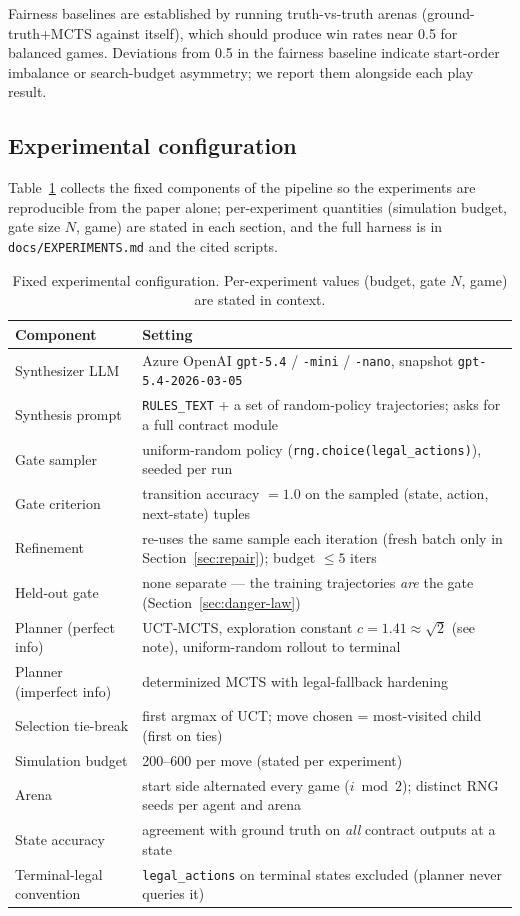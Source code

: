 \documentclass[11pt]{article}
\theoremstyle{remark}
\begin{document}
Fairness baselines are established by running truth-vs-truth arenas (ground-truth+MCTS against itself), which should produce win rates near 0.5 for balanced games. Deviations from 0.5 in the fairness baseline indicate start-order imbalance or search-budget asymmetry; we report them alongside each play result.

\subsection{Experimental configuration}
\label{sec:config}

Table~\ref{tab:config} collects the fixed components of the pipeline so the experiments are reproducible from the paper alone; per-experiment quantities (simulation budget, gate size $N$, game) are stated in each section, and the full harness is in \texttt{docs/EXPERIMENTS.md} and the cited scripts.

\begin{table}[ht]
\centering
\small
\begin{tabular}{@{}l p{}@{}}
\toprule
Component & Setting \\
\midrule
Synthesizer LLM & Azure OpenAI \texttt{gpt-5.4} / \texttt{-mini} / \texttt{-nano}, snapshot \texttt{gpt-5.4-2026-03-05} \\
Synthesis prompt & \texttt{RULES\_TEXT} + a set of random-policy trajectories; asks for a full contract module \\
Gate sampler & uniform-random policy (\texttt{rng.choice(legal\_actions)}), seeded per run \\
Gate criterion & transition accuracy $=1.0$ on the sampled (state, action, next-state) tuples \\
Refinement & re-uses the same sample each iteration (fresh batch only in Section~\ref{sec:repair}); budget $\leq 5$ iters \\
Held-out gate & none separate --- the training trajectories \emph{are} the gate (Section~\ref{sec:danger-law}) \\
Planner (perfect info) & UCT-MCTS, exploration constant $c = 1.41 \approx \sqrt{2}$ (see note), uniform-random rollout to terminal \\
Planner (imperfect info) & determinized MCTS \citep{cowling2012ismcts,long2010pimc} with legal-fallback hardening \\
Selection tie-break & first argmax of UCT; move chosen = most-visited child (first on ties) \\
Simulation budget & 200--600 per move (stated per experiment) \\
Arena & start side alternated every game ($i \bmod 2$); distinct RNG seeds per agent and arena \\
State accuracy & agreement with ground truth on \emph{all} contract outputs at a state \\
Terminal-legal convention & \texttt{legal\_actions} on terminal states excluded (planner never queries it) \\
\bottomrule
\end{tabular}
\caption{Fixed experimental configuration. Per-experiment values (budget, gate $N$, game) are stated in context.}
\label{tab:config}
\end{table}
\end{document}
